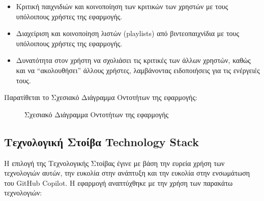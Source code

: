 \begin{itemize}
    \item Κριτική παιχνιδιών και κοινοποίηση των κριτικών των χρηστών με τους υπόλοιπους χρήστες της εφαρμογής.
    \item Διαχείριση και κοινοποίηση λιστών \textlatin{(playlists)} από βιντεοπαιχνίδια με τους υπόλοιπους χρήστες της εφαρμογής.
    \item Δυνατότητα στον χρήστη να σχολιάσει τις κριτικές των άλλων χρηστών, καθώς και να ``ακολουθήσει'' άλλους χρήστες, λαμβάνοντας ειδοποιήσεις για τις ενέργειές τους.
\end{itemize}

Παρατίθεται το Σχεσιακό Διάγραμμα Οντοτήτων της εφαρμογής:

\begin{figure}[H]
  \begin{center}
    \caption{Σχεσιακό Διάγραμμα Οντοτήτων της εφαρμογής}
    \label{fig:RDD}
  \end{center}
\end{figure}
 
\subsection{Τεχνολογική Στοίβα \textlatin{Technology Stack}}
Η επιλογή της Τεχνολογικής Στοίβας έγινε με βάση την ευρεία χρήση των τεχνολογιών αυτών, την ευκολία στην ανάπτυξη και την ευκολία στην ενσωμάτωση του \textlatin{GitHub Copilot}. Η εφαρμογή αναπτύχθηκε με την χρήση των παρακάτω τεχνολογιών:
 
